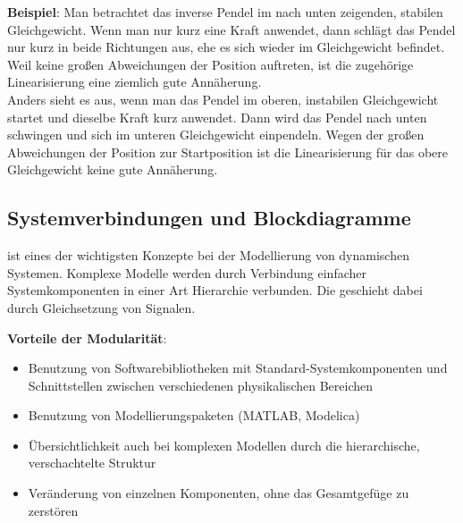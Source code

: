 \linie

\textbf{Beispiel}:
Man betrachtet das inverse Pendel im nach unten zeigenden, stabilen Gleichgewicht.
Wenn man nur kurz eine Kraft anwendet, dann schlägt das Pendel nur kurz in beide Richtungen
aus, ehe es sich wieder im Gleichgewicht befindet.
Weil keine großen Abweichungen der Position auftreten, ist die zugehörige Linearisierung eine
ziemlich gute Annäherung.\\
Anders sieht es aus, wenn man das Pendel im oberen, instabilen Gleichgewicht startet
und dieselbe Kraft kurz anwendet.
Dann wird das Pendel nach unten schwingen und sich im unteren Gleichgewicht einpendeln.
Wegen der großen Abweichungen der Position zur Startposition ist die Linearisierung für
das obere Gleichgewicht keine gute Annäherung.

\pagebreak

\subsection{%
    Systemverbindungen und Blockdiagramme%
}

 ist eines der wichtigsten Konzepte bei der Modellierung von
dynamischen Systemen.
Komplexe Modelle werden durch Verbindung einfacher Systemkomponenten in einer Art Hierarchie
verbunden.
Die  geschieht dabei durch Gleichsetzung von Signalen.

\textbf{Vorteile der Modularität}:
\begin{itemize}
    \item
    Benutzung von Softwarebibliotheken mit Standard-Systemkomponenten und
    Schnittstellen zwischen verschiedenen physikalischen Bereichen

    \item
    Benutzung von Modellierungspaketen (MATLAB, Modelica)

    \item
    Übersichtlichkeit auch bei komplexen Modellen durch die hierarchische, verschachtelte
    Struktur

    \item
    Veränderung von einzelnen Komponenten, ohne das Gesamtgefüge zu zerstören
\end{itemize}

\linie

